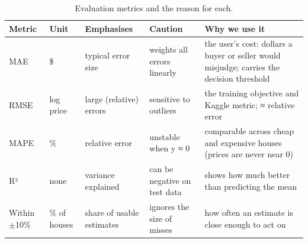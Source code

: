 \begin{table}[t]
\centering
\small
\begin{tabular}{lllll}
\toprule
Metric & Unit & Emphasises & Caution & Why we use it \\
\midrule
MAE & \$ & typical error size & weights all errors linearly & the user's cost: dollars a buyer or seller would misjudge; carries the decision threshold \\
RMSE & log price & large (relative) errors & sensitive to outliers & the training objective and Kaggle metric; ≈ relative error \\
MAPE & \% & relative error & unstable when y ≈ 0 & comparable across cheap and expensive houses (prices are never near 0) \\
R² & none & variance explained & can be negative on test data & shows how much better than predicting the mean \\
Within $\pm$10\% & \% of houses & share of usable estimates & ignores the size of misses & how often an estimate is close enough to act on \\
\bottomrule
\end{tabular}
\caption{Evaluation metrics and the reason for each.}
\label{tab:metrics}
\end{table}
